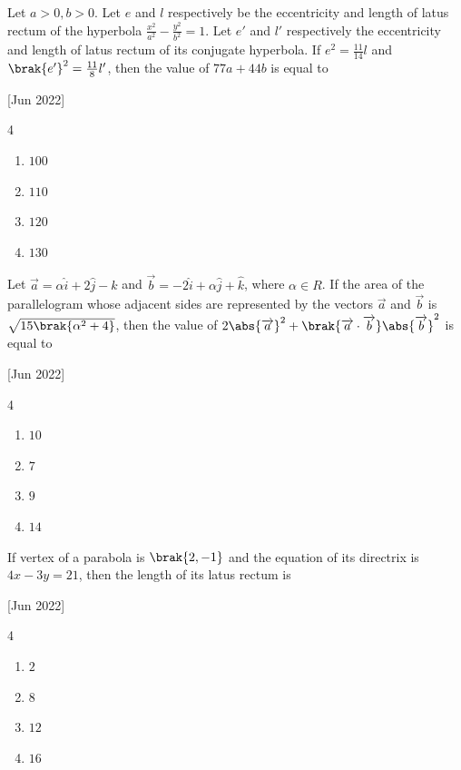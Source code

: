     \item Let $a>0, b>0$. Let $e$ and $l$ respectively be the eccentricity and length of latus rectum of the hyperbola $\frac{x^2}{a^2}-\frac{y^2}{b^2}=1$. Let $e'$ and $l'$ respectively the eccentricity and length of latus rectum of its conjugate hyperbola. If $e^2=\frac{11}{14}l$ and $\brak{e'}^2=\frac{11}{8}l'$, then the value of $77a+44b$ is equal to
    
    \hfill{[Jun 2022]}

        \begin{multicols}{4}
            \begin{enumerate}
                \item $100$
                \item $110$
                \item $120$
                \item $130$
            \end{enumerate}
        \end{multicols}

    \item Let $\overrightarrow{a}=\alpha \hat{i}+2\hat{j}-\hat{k}$ and $\overrightarrow{b}=-2\hat{i}+\alpha\hat{j}+\hat{k}$, where $\alpha\in R$. If the area of the parallelogram whose adjacent sides are represented by the vectors $\overrightarrow{a}$ and $\overrightarrow{b}$ is $\sqrt{15\brak{\alpha^2+4}}$, then the value of $2\abs{\overrightarrow{a}}^2+\brak{\overrightarrow{a}\cdot\overrightarrow{b}}\abs{\overrightarrow{b}}^2$ is equal to
    
    \hfill{[Jun 2022]}

        \begin{multicols}{4}
            \begin{enumerate}
                \item $10$
                \item $7$
                \item $9$
                \item $14$
            \end{enumerate}
        \end{multicols}

    \item If vertex of a parabola is $\brak{2,-1}$ and the equation of its directrix is $4x-3y=21$, then the length of its latus rectum is
    
    \hfill{[Jun 2022]}
    
        \begin{multicols}{4}
            \begin{enumerate}
                \item $2$
                \item $8$
                \item $12$
                \item $16$
            \end{enumerate}
        \end{multicols}

